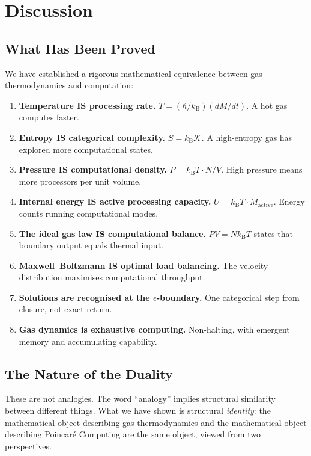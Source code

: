 \documentclass[twocolumn,10pt,a4paper]{article}
\theoremstyle{plain}
\theoremstyle{definition}
\theoremstyle{remark}
\newcommand{\kB}{k_{\mathrm{B}}}
\begin{document}
\section{Discussion}
\label{sec:discussion}

\subsection{What Has Been Proved}

We have established a rigorous mathematical equivalence between gas thermodynamics and computation:

\begin{enumerate}
    \item \textbf{Temperature IS processing rate.} $T = (\hbar/\kB)(dM/dt)$. A hot gas computes faster.
    \item \textbf{Entropy IS categorical complexity.} $S = \kB \mathcal{K}$. A high-entropy gas has explored more computational states.
    \item \textbf{Pressure IS computational density.} $P = \kB T \cdot N/V$. High pressure means more processors per unit volume.
    \item \textbf{Internal energy IS active processing capacity.} $U = \kB T \cdot M_{\mathrm{active}}$. Energy counts running computational modes.
    \item \textbf{The ideal gas law IS computational balance.} $PV = N\kB T$ states that boundary output equals thermal input.
    \item \textbf{Maxwell--Boltzmann IS optimal load balancing.} The velocity distribution maximises computational throughput.
    \item \textbf{Solutions are recognised at the $\epsilon$-boundary.} One categorical step from closure, not exact return.
    \item \textbf{Gas dynamics is exhaustive computing.} Non-halting, with emergent memory and accumulating capability.
\end{enumerate}

\subsection{The Nature of the Duality}

These are not analogies. The word ``analogy'' implies structural similarity between different things. What we have shown is structural \emph{identity}: the mathematical object describing gas thermodynamics and the mathematical object describing Poincar\'{e} Computing are the same object, viewed from two perspectives.
\end{document}
